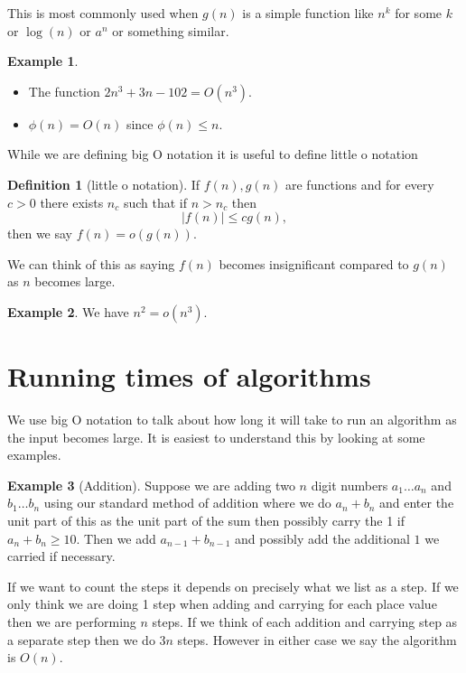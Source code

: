 \documentclass[
]{book}
\theoremstyle{definition}
\newtheorem{definition}{Definition}[chapter]
\theoremstyle{definition}
\newtheorem{example}{Example}[chapter]
\theoremstyle{definition}
\theoremstyle{definition}
\theoremstyle{remark}
\begin{document}
This is most commonly used when \(g(n)\) is a simple function like \(n^k\) for some \(k\) or \(\log(n)\) or \(a^n\) or something similar.

\begin{example}

\begin{itemize}
\item
  The function \(2n^3 + 3n - 102 = O(n^3)\).
\item
  \(\phi(n) = O(n)\) since \(\phi(n) \leq n\).
\end{itemize}

\end{example}

While we are defining big O notation it is useful to define little o notation

\begin{definition}[little o notation]
If \(f(n), g(n)\) are functions and for every \(c >0\) there exists \(n_c\) such that if \(n >n_c\) then
\[ |f(n)| \leq c g(n),\]
then we say \(f(n) = o(g(n))\).

We can think of this as saying \(f(n)\) becomes insignificant compared to \(g(n)\) as \(n\) becomes large.
\end{definition}

\begin{example}
We have \(n^2 = o(n^3)\).
\end{example}

\section{Running times of algorithms}\label{running-times-of-algorithms}

We use big O notation to talk about how long it will take to run an algorithm as the input becomes large. It is easiest to understand this by looking at some examples.

\begin{example}[Addition]
Suppose we are adding two \(n\) digit numbers \(a_1\dots a_n\) and \(b_1\dots b_n\) using our standard method of addition where we do \(a_n+b_n\) and enter the unit part of this as the unit part of the sum then possibly carry the 1 if \(a_n + b_n \geq 10\). Then we add \(a_{n-1} + b_{n-1}\) and possibly add the additional \(1\) we carried if necessary.

If we want to count the steps it depends on precisely what we list as a step. If we only think we are doing 1 step when adding and carrying for each place value then we are performing \(n\) steps. If we think of each addition and carrying step as a separate step then we do \(3n\) steps. However in either case we say the algorithm is \(O(n)\).
\end{example}
\end{document}
